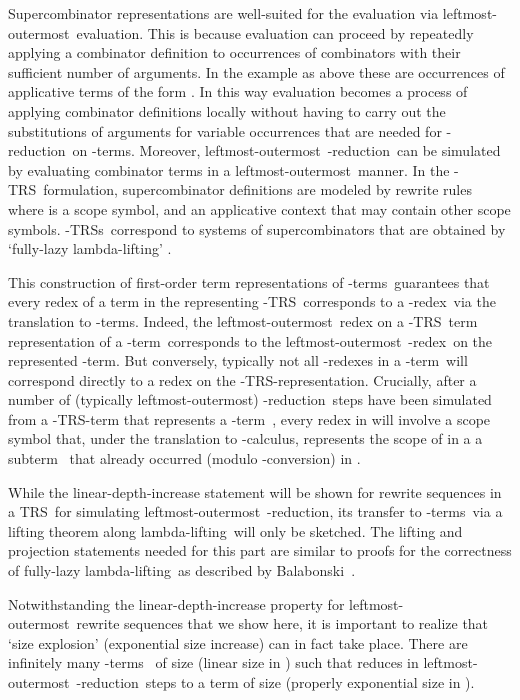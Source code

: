 \documentclass[
submission
]{dmtcs-episciences-tampered}
\newcommand{\nb}{\nobreakdash}
\newcommand{\TRS}{TRS}
\newcommand{\lambdacalculus}{\nb-cal\-cu\-lus}
\newcommand{\lambdaterm}{\nb-term}
\newcommand{\lambdaterms}{\lambdaterm{s}}
\newcommand{\lambdalifting}{lambda-lif\-ting}
\newcommand{\betareduction}{\nb-re\-duc\-tion}
\newcommand{\betaredex}{\nb-re\-dex}
\newcommand{\alphaconversion}{\nb-con\-ver\-sion}
\newcommand{\lo}{left\-most-outer\-most}
\newcommand{\lTRSrepresentation}{\lTRS\nb-re\-pre\-sen\-ta\-tion}
\newcommand{\lTRS}{\hspace*{-0.5pt}\nb-\hspace*{-0.5pt}\TRS}
\newcommand{\lTRSs}{\lTRS{s}}
\theoremstyle{plain}
\theoremstyle{definition}
\begin{document}
  Supercombinator representations are well-suited for the evaluation via \lo\ evaluation. This is because evaluation can proceed by repeatedly applying a combinator definition
  to occurrences of combinators with their sufficient number of arguments.
  In the example as above these are occurrences of applicative terms of the form . 
  In this way evaluation becomes a process of applying combinator definitions locally 
  without having to carry out the substitutions of arguments for variable occurrences that are needed for \betareduction\ on \lambdaterms.
  Moreover, \lo\ \betareduction\ can be simulated by evaluating combinator terms in a \lo\ manner. 
  In the \lTRS\ formulation,
  supercombinator definitions are modeled by rewrite rules 
   where  is a scope symbol,
  and  an applicative context that may contain other scope symbols.
  \lTRSs\ correspond to systems of supercombinators that are obtained by `fully-lazy \lambdalifting' \cite{hugh:1982:report,peyt:1987}. 
  
  This construction of first-order term representations of \lambdaterms\ 
  guarantees that every redex of a term in the representing \lTRS\
  corresponds to a \betaredex\ via the translation to \lambdaterms. 
  Indeed, the \lo\ redex on a \lTRS\ term representation of a \lambdaterm\ corresponds to the \lo\ \betaredex\ on the represented \lambdaterm. 
  But conversely, typically not all \betaredex{es} in a \lambdaterm\ will correspond directly to a redex on the \lTRSrepresentation.
  Crucially, after a number of (typically \lo) \betareduction\ steps  
    have been simulated from a \lTRS\nb-term  that represents a \lambdaterm~,
  every redex  in  will involve a scope symbol  that, 
  under the translation to \lambdacalculus,
  represents the scope of  in a a subterm~ that already occurred (modulo \alphaconversion) in . 
  
  \smallskip





While the linear-depth-increase statement will be shown for rewrite sequences in a \TRS\
for simulating \lo\ \betareduction, its transfer to \lambdaterms\ via a lifting theorem along \lambdalifting\
will only be sketched. The lifting and projection statements needed for this part are similar
to proofs for the correctness of fully-lazy \lambdalifting\ as described by Balabonski~\cite{bala:2012}.   

Notwithstanding the linear-depth-increase property for \lo\ rewrite sequences that we show here,
it is important to realize that `size explosion' (exponential size increase) can in fact take place.
There are infinitely many \lambdaterms~ of size  (linear size in )
such that  reduces in  \lo\ \betareduction\ steps
to a term of size  (properly exponential size in ). 
\end{document}
